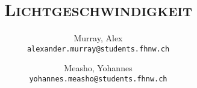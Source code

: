 \author{%
    Murray, Alex\\
    \texttt{alexander.murray@students.fhnw.ch}
    \and
    Measho, Yohannes\\
    \texttt{yohannes.measho@students.fhnw.ch}
}

\title{
    \vspace{20mm}
    \Huge{\textsc{Lichtgeschwindigkeit}}
}
